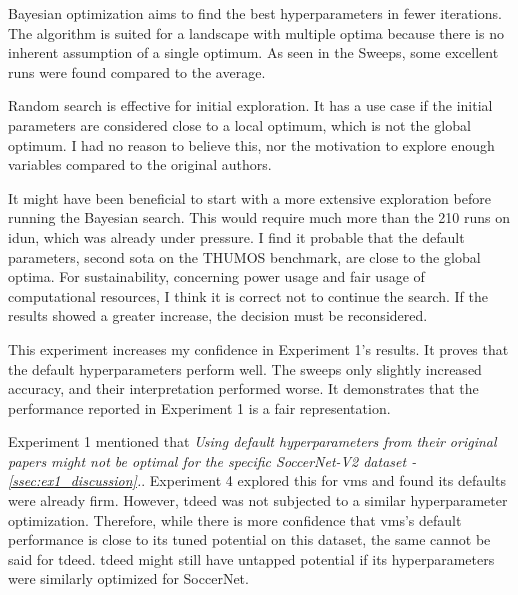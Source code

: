 Bayesian optimization aims to find the best hyperparameters in fewer iterations. The algorithm is suited for a landscape with multiple optima because there is no inherent assumption of a single optimum. As seen in the Sweeps, some excellent runs were found compared to the average. 

Random search is effective for initial exploration. It has a use case if the initial parameters are considered close to a local optimum, which is not the global optimum. I had no reason to believe this, nor the motivation to explore enough variables compared to the original authors\cite{li_videomamba_2024}.


It might have been beneficial to start with a more extensive exploration before running the Bayesian search. This would require much more than the 210 runs on \acrshort{idun}, which was already under pressure. I find it probable that the default parameters, second \acrshort{sota} on the THUMOS benchmark, are close to the global optima. For sustainability, concerning power usage and fair usage of computational resources, I think it is correct not to continue the search. If the results showed a greater increase, the decision must be reconsidered.




This experiment increases my confidence in Experiment 1's results. It proves that the default hyperparameters perform well. The sweeps only slightly increased accuracy, and their interpretation performed worse. It demonstrates that the performance reported in Experiment 1 is a fair representation.

Experiment 1 mentioned that \textit{Using default hyperparameters from their original papers might not be optimal for the specific SoccerNet-V2 dataset - \cref{ssec:ex1_discussion}.}. Experiment 4 explored this for \acrshort{vms} and found its defaults were already firm. However, \acrshort{tdeed} was not subjected to a similar hyperparameter optimization. Therefore, while there is more confidence that \acrshort{vms}'s default performance is close to its tuned potential on this dataset, the same cannot be said for \acrshort{tdeed}. \acrshort{tdeed} might still have untapped potential if its hyperparameters were similarly optimized for SoccerNet.




